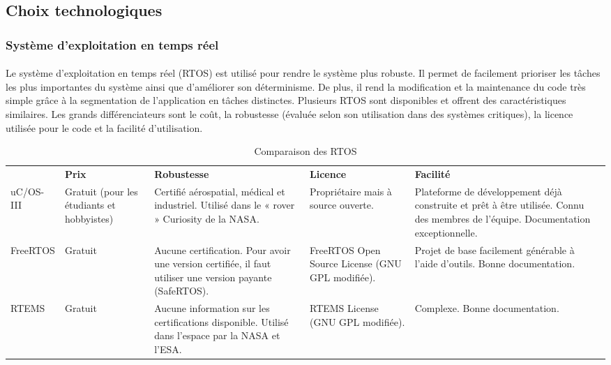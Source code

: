 \subsection{Choix technologiques}
	\subsubsection*{Système d'exploitation en temps réel}
		\paragraph*{}
		Le système d’exploitation en temps réel (RTOS) est utilisé pour rendre le système plus robuste. Il permet de facilement prioriser les tâches les plus importantes du système ainsi que d’améliorer son déterminisme. De plus, il rend la modification et la maintenance du code très simple grâce à la segmentation de l’application en tâches distinctes. Plusieurs RTOS sont disponibles et offrent des caractéristiques similaires. Les grands différenciateurs sont le coût, la robustesse (évaluée selon son utilisation dans des systèmes critiques), la licence utilisée pour le code et la facilité d’utilisation.

		\begin{table}[H]
			\centering
			\caption{Comparaison des RTOS}
			\label{my-label}
			\begin{tabular}{|p{3cm}|p{3cm}|p{3cm}|p{3cm}|p{3cm}|}
				\hline &
				\textbf{Prix} & \textbf{Robustesse} & \textbf{Licence} & \textbf{Facilité}
				\\ \hhline{|=|=|=|=|=|}
				uC/OS-III &
				Gratuit (pour les étudiants et hobbyistes) &
				Certifié aérospatial, médical et industriel.
				Utilisé dans le « rover » Curiosity de la NASA. &
				Propriétaire mais à source ouverte. &
				Plateforme de développement déjà construite et prêt à être utilisée.
				Connu des membres de l’équipe.
				Documentation exceptionnelle.
				\\ \hline
				FreeRTOS &
				Gratuit &
				Aucune certification. Pour avoir une version certifiée, il faut utiliser une version payante (SafeRTOS). &
				FreeRTOS Open Source License (GNU GPL modifiée). &
				Projet de base facilement générable à l’aide d’outils.
				Bonne documentation.
				\\ \hline
				RTEMS &
				Gratuit &
				Aucune information sur les certifications disponible.
				Utilisé dans l’espace par la NASA et l’ESA. &
				RTEMS License (GNU GPL modifiée). &
				Complexe.
				Bonne documentation.                                                                              \\ \hline
			\end{tabular}
		\end{table}

